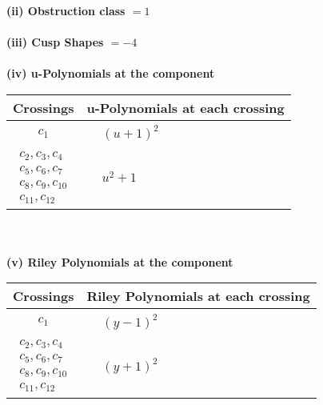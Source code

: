 \documentclass[1p]{elsarticle_modified}
\theoremstyle{definition}
\begin{document}
\flushleft \textbf{(ii) Obstruction class $= 1$}\\~\\
\flushleft \textbf{(iii) Cusp Shapes $= -4$}\\~\\
\newpage\renewcommand{\arraystretch}{1}
\flushleft \textbf{(iv) u-Polynomials at the component}\newline \\
\begin{tabular}{m{50pt}|m{274pt}}
Crossings & \hspace{64pt}u-Polynomials at each crossing \\
\hline $$\begin{aligned}c_{1}\end{aligned}$$&$\begin{aligned}
&(u+1)^2
\end{aligned}$\\
\hline $$\begin{aligned}c_{2},c_{3},c_{4}\\c_{5},c_{6},c_{7}\\c_{8},c_{9},c_{10}\\c_{11},c_{12}\end{aligned}$$&$\begin{aligned}
&u^2+1
\end{aligned}$\\
\hline
\end{tabular}\\~\\
\newpage\renewcommand{\arraystretch}{1}
\flushleft \textbf{(v) Riley Polynomials at the component}\newline \\
\begin{tabular}{m{50pt}|m{274pt}}
Crossings & \hspace{64pt}Riley Polynomials at each crossing \\
\hline $$\begin{aligned}c_{1}\end{aligned}$$&$\begin{aligned}
&(y-1)^2
\end{aligned}$\\
\hline $$\begin{aligned}c_{2},c_{3},c_{4}\\c_{5},c_{6},c_{7}\\c_{8},c_{9},c_{10}\\c_{11},c_{12}\end{aligned}$$&$\begin{aligned}
&(y+1)^2
\end{aligned}$\\
\hline
\end{tabular}\\~\\
\end{document}
